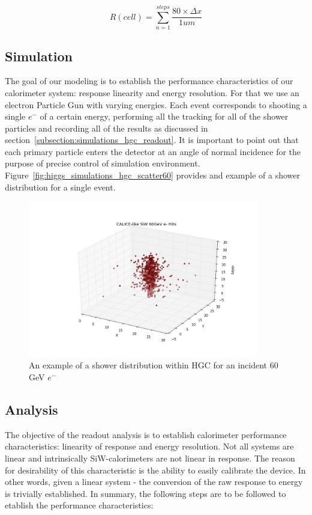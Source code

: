 \begin{center}
    \begin{equation}
        \label{eq:simulation_hgc_responsePerCell}
        {R(cell)} = {\sum_{n=1}^{steps} \frac{80\times \Delta x}{1um}}
   \end{equation}
\end{center}

\subsection{Simulation}
The goal of our modeling is to establish the performance characteristics of our calorimeter system: response linearity and energy resolution. For that we use an electron Particle Gun with varying energies. Each event corresponds to shooting a single $e^-$ of a certain energy, performing all the tracking for all of the shower particles and recording all of the results as discussed in section~\ref{subsection:simulations_hgc_readout}. It is important to point out that each primary particle enters the detector at an angle of normal incidence for the purpose of precise control of simulation environment. Figure~\ref{fig:higgs_simulations_hgc_scatter60} provides and example of a shower distribution for a single event.

\begin{figure}[hbp]
    \centering
    \includegraphics[width=0.9\textwidth]{figures/ch_simulations/hgc/scatter_3d/scatter_3D_60GeV.png}
    \caption{An example of a shower distribution within HGC for an incident 60 GeV $e^-$}
    \label{fig:simulations_hgc_scatter60}
 \end{figure}

\subsection{Analysis}
The objective of the readout analysis is to establish calorimeter performance characteristics: linearity of response and energy resolution. Not all systems are linear and intrinsically SiW-calorimeters are not linear in response. The reason for desirability of this characteristic is the ability to easily calibrate the device. In other words, given a linear system - the conversion of the raw response to energy is trivially established. In summary, the following steps are to be followed to etablish the performance characteristics:

